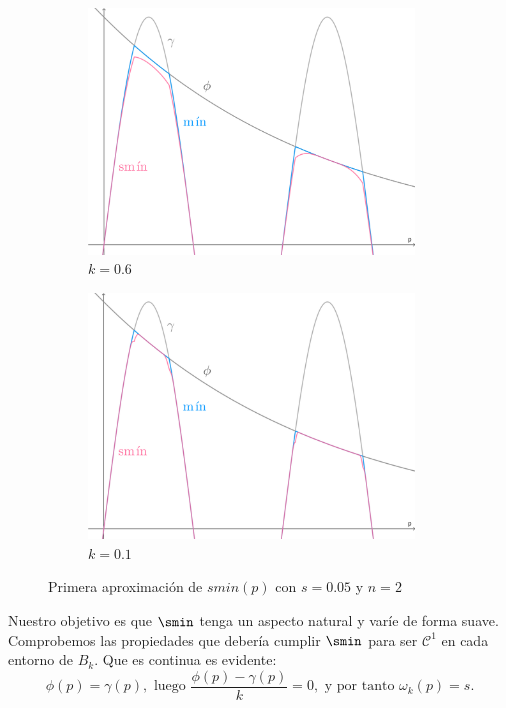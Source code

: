 \begin{figure}[!h]
     \begin{subfigure}[b]{0.49\linewidth}
        \centering
        \includegraphics[width=0.95\textwidth]{Plantilla-TFG-master/img/smin_1.png}
        \caption{$k=0.6$}
     \end{subfigure}
     \begin{subfigure}[b]{0.49\linewidth}
        \centering
        \includegraphics[width=0.95\textwidth]{Plantilla-TFG-master/img/smin_2.png}
        \caption{$k=0.1$}
     \end{subfigure}
     \caption{Primera aproximación de $smin(p)$ con $s=0.05$ y $n=2$}
     \label{fig:smooth1}
\end{figure}

Nuestro objetivo es que $\smin$ tenga un aspecto natural y varíe de forma suave. Comprobemos las propiedades que debería cumplir $\smin$ para ser $\mathcal{C}^1$ en cada entorno de $B_k$. Que es continua es evidente:
\begin{equation*}
    \phi(p)=\gamma(p), \text{ luego } \frac{\phi(p)-\gamma(p)}{k} = 0, \text{ y por tanto } \omega_k(p) = s.
\end{equation*}

